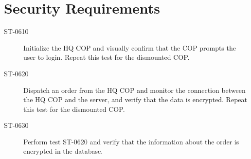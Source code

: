 \section{Security Requirements}


\begin{description}
\item[ST-0610] Initialize the HQ COP and visually confirm that the COP prompts the user to login. Repeat this test for the dismounted COP.
\item[ST-0620] Dispatch an order from the HQ COP and monitor the connection between the HQ COP and the server, and verify that the data is encrypted. Repeat this test for the dismounted COP. 
\item[ST-0630] Perform test ST-0620 and verify that the information about the order is encrypted in the database.
\end{description}
